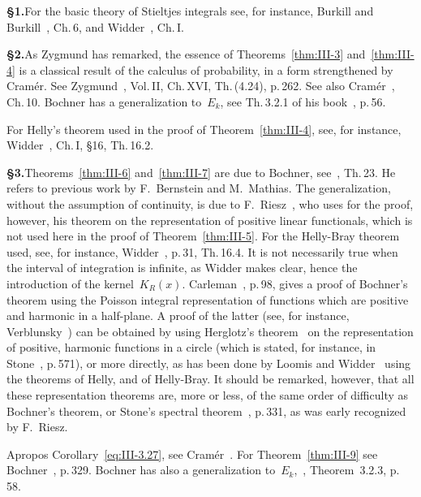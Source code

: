 \noindent\textbf{§1.}\quad For the basic theory of Stieltjes integrals see, for instance, Burkill and Burkill~\cite{burkillburkill1970}, Ch.\,6, and Widder~\cite{widder1941}, Ch.\,I.

\noindent\textbf{§2.}\quad As Zygmund has remarked, the essence of Theorems~\ref{thm:III-3} and~\ref{thm:III-4} is a classical result of the calculus of probability, in a form strengthened by Cram\'er. See Zygmund~\cite{zygmund1959}, Vol.\,II, Ch.\,XVI, Th.\,(4.24), p.\,262. See also Cram\'er~\cite{cramer1946}, Ch.\,10. Bochner has a generalization to~$E_k$, see Th.\,3.2.1 of his book~\cite{bochner1955}, p.\,56.

\noindent For Helly's theorem used in the proof of Theorem~\ref{thm:III-4}, see, for instance, Widder~\cite{widder1941}, Ch.\,I, §16, Th.\,16.2.

\noindent\textbf{§3.}\quad Theorems~\ref{thm:III-6} and~\ref{thm:III-7} are due to Bochner, see~\cite{bochner1932}, Th.\,23. He refers to previous work by F.~Bernstein and M.~Mathias. The generalization, without the assumption of continuity, is due to F.~Riesz~\cite{riesz1927}, who uses for the proof, however, his theorem on the representation of positive linear functionals, which is not used here in the proof of Theorem~\ref{thm:III-5}. For the Helly-Bray theorem used, see, for instance, Widder~\cite{widder1941}, p.\,31, Th.\,16.4. It is not necessarily true when the interval of integration is infinite, as Widder makes clear, hence the introduction of the kernel~$K_{R}(x)$. Carleman~\cite{carleman1944}, p.\,98, gives a proof of Bochner's theorem using the Poisson integral representation of functions which are positive and harmonic in a half-plane. A proof of the latter (see, for instance, Verblunsky~\cite{verblunsky1935}) can be obtained by using Herglotz's theorem~\cite{herglotz1911} on the representation of positive, harmonic functions in a circle (which is stated, for instance, in Stone~\cite{stone1932}, p.\,571), or more directly, as has been done by Loomis and Widder~\cite{loomiswidder1942} using the theorems of Helly, and of Helly-Bray. It should be remarked, however, that all these representation theorems are, more or less, of the same order of difficulty as Bochner's theorem, or Stone's spectral theorem~\cite{stone1932}, p.\,331, as was early recognized by F.~Riesz.

\noindent Apropos Corollary~\eqref{eq:III-3.27}, see Cram\'er~\cite{cramer1939}. For Theorem~\ref{thm:III-9} see Bochner~\cite{bochner1959}, p.\,329. Bochner has also a generalization to~$E_k$,~\cite{bochner1955}, Theorem~3.2.3, p.\,58.

